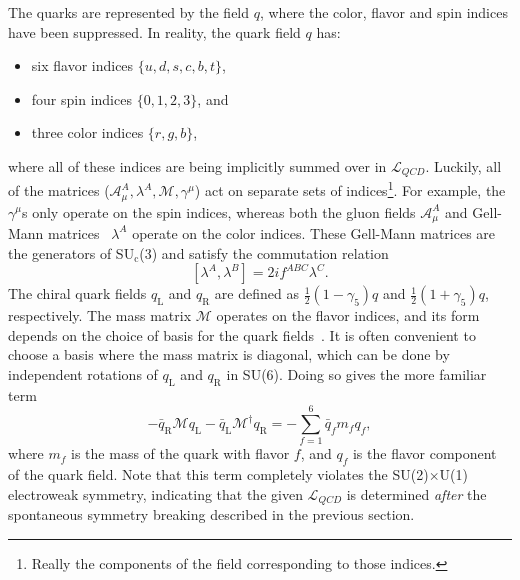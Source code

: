 The quarks are represented by the field $q$, where the color, flavor and spin indices have been suppressed. In reality, the quark field $q$ has:
%
\begin{itemize}
    \item six flavor indices $\{u, d, s, c, b, t\}$,
    \item four spin indices $\{0, 1, 2, 3\}$, and
    \item three color indices $\{r, g, b\}$,
\end{itemize}
%
where all of these indices are being implicitly summed over in $\mathcal{L}_{QCD}$. Luckily, all of the matrices ($\mathcal{A}_\mu^A, \lambda^A, \mathcal{M}, \gamma^\mu$) act on separate sets of indices\footnote{Really the components of the field corresponding to those indices.}. For example, the $\gamma^\mu$s only operate on the spin indices, whereas both the gluon fields $\mathcal{A}_\mu^A$ and Gell-Mann matrices~\cite{GellMannEightfold} $\lambda^A$ operate on the color indices. These Gell-Mann matrices are the generators of SU$_\text{c}$(3) and satisfy the commutation relation
%
\begin{equation}
    \label{eq:gell_mann_commutation}
    [\lambda^A, \lambda^B] = 2if^{ABC}\lambda^C.
\end{equation}
%
The chiral quark fields $q_\text{L}$ and $q_\text{R}$ are defined as $\frac{1}{2}(1 - \gamma_5)q$ and $\frac{1}{2}(1 + \gamma_5)q$, respectively. The mass matrix $\mathcal{M}$ operates on the flavor indices, and its form depends on the choice of basis for the quark fields~\cite{QCDHistory}. It is often convenient to choose a basis where the mass matrix is diagonal, which can be done by independent rotations of $q_\text{L}$ and $q_\text{R}$ in SU(6). Doing so gives the more familiar term
%
\begin{equation}
    -\bar{q}_{\mathrm{R}} \mathcal{M} q_{\mathrm{L}}-\bar{q}_{\mathrm{L}} \mathcal{M}^{\dagger} q_{\mathrm{R}} = -\sum_{f = 1}^{6}\bar{q}_f m_f q_f,
    \label{eq:mass_matrix}
\end{equation}
where $m_f$ is the mass of the quark with flavor $f$, and $q_f$ is the flavor component of the quark field. Note that this term completely violates the SU(2)$\times$U(1) electroweak symmetry, indicating that the given $\mathcal{L}_{QCD}$ is determined \textit{after} the spontaneous symmetry breaking described in the previous section. 

